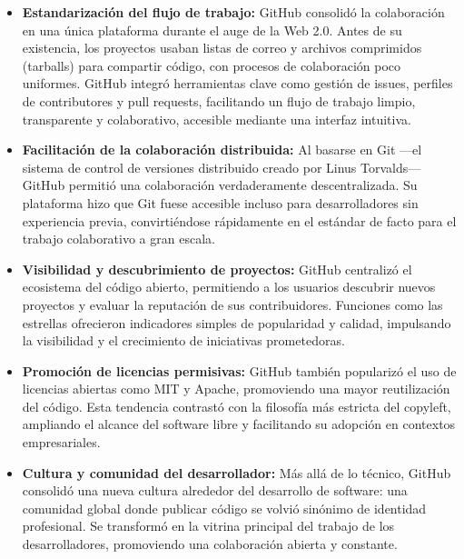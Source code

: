 \documentclass[a4paper,12pt]{article}
\begin{document}
\begin{itemize}
    \item \textbf{Estandarización del flujo de trabajo:} GitHub consolidó la
    colaboración en una única plataforma durante el auge de la Web 2.0. Antes de
    su existencia, los proyectos usaban listas de correo y archivos comprimidos
    (tarballs) para compartir código, con procesos de colaboración poco
    uniformes. GitHub integró herramientas clave como gestión de issues,
    perfiles de contributores y pull requests, facilitando un flujo de trabajo
    limpio, transparente y colaborativo, accesible mediante una interfaz
    intuitiva.

    \item \textbf{Facilitación de la colaboración distribuida:} Al basarse en
    Git —el sistema de control de versiones distribuido creado por Linus
    Torvalds— GitHub permitió una colaboración verdaderamente descentralizada.
    Su plataforma hizo que Git fuese accesible incluso para desarrolladores sin
    experiencia previa, convirtiéndose rápidamente en el estándar de facto para
    el trabajo colaborativo a gran escala.

    \item \textbf{Visibilidad y descubrimiento de proyectos:} GitHub centralizó
    el ecosistema del código abierto, permitiendo a los usuarios descubrir
    nuevos proyectos y evaluar la reputación de sus contribuidores. Funciones
    como las estrellas ofrecieron indicadores simples de popularidad y calidad,
    impulsando la visibilidad y el crecimiento de iniciativas prometedoras.

    \item \textbf{Promoción de licencias permisivas:} GitHub también popularizó
    el uso de licencias abiertas como MIT y Apache, promoviendo una mayor
    reutilización del código. Esta tendencia contrastó con la filosofía más
    estricta del copyleft, ampliando el alcance del software libre y facilitando
    su adopción en contextos empresariales.

    \item \textbf{Cultura y comunidad del desarrollador:} Más allá de lo
    técnico, GitHub consolidó una nueva cultura alrededor del desarrollo de
    software: una comunidad global donde publicar código se volvió sinónimo de
    identidad profesional. Se transformó en la vitrina principal del trabajo de
    los desarrolladores, promoviendo una colaboración abierta y constante.
\end{itemize}
\end{document}
